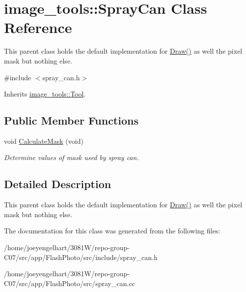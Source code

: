 \hypertarget{classimage__tools_1_1SprayCan}{}\section{image\+\_\+tools\+:\+:Spray\+Can Class Reference}
\label{classimage__tools_1_1SprayCan}


This parent class holds the default implementation for \hyperlink{classimage__tools_1_1Tool_aa5a313769f2a2c5c83b816da81e82bd2}{Draw()} as well the pixel mask but nothing else.  




{\ttfamily \#include $<$spray\+\_\+can.\+h$>$}



Inherits \hyperlink{classimage__tools_1_1Tool}{image\+\_\+tools\+::\+Tool}.

\subsection*{Public Member Functions}
\begin{DoxyCompactItemize}
\item 
void \hyperlink{classimage__tools_1_1SprayCan_afe5218c111ce851e6cdf70c12513819e}{Calculate\+Mask} (void)\hypertarget{classimage__tools_1_1SprayCan_afe5218c111ce851e6cdf70c12513819e}{}\label{classimage__tools_1_1SprayCan_afe5218c111ce851e6cdf70c12513819e}

\begin{DoxyCompactList}\small\item\em Determine values of mask used by spray can. \end{DoxyCompactList}\end{DoxyCompactItemize}


\subsection{Detailed Description}
This parent class holds the default implementation for \hyperlink{classimage__tools_1_1Tool_aa5a313769f2a2c5c83b816da81e82bd2}{Draw()} as well the pixel mask but nothing else. 

The documentation for this class was generated from the following files\+:\begin{DoxyCompactItemize}
\item 
/home/joeyengelhart/3081\+W/repo-\/group-\/\+C07/src/app/\+Flash\+Photo/src/include/spray\+\_\+can.\+h\item 
/home/joeyengelhart/3081\+W/repo-\/group-\/\+C07/src/app/\+Flash\+Photo/src/spray\+\_\+can.\+cc\end{DoxyCompactItemize}
